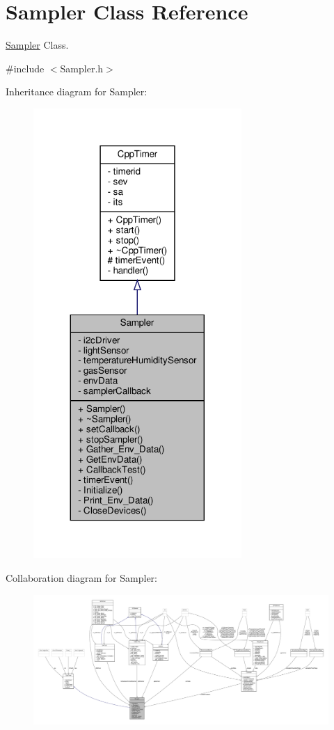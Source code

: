 \hypertarget{classSampler}{}\section{Sampler Class Reference}
\label{classSampler}


\hyperlink{classSampler}{Sampler} Class.  




{\ttfamily \#include $<$Sampler.\+h$>$}



Inheritance diagram for Sampler\+:\nopagebreak
\begin{figure}[H]
\begin{center}
\leavevmode
\includegraphics[width=224pt]{classSampler__inherit__graph}
\end{center}
\end{figure}


Collaboration diagram for Sampler\+:\nopagebreak
\begin{figure}[H]
\begin{center}
\leavevmode
\includegraphics[width=350pt]{classSampler__coll__graph}
\end{center}
\end{figure}
